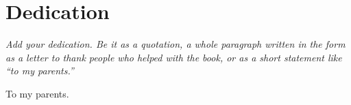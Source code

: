 
\thispagestyle{empty}


\chapter{Dedication}\label{dedication:cha}

\textit{Add your dedication. Be it as a quotation, a whole paragraph written in the form as a letter to thank people who helped with the book, or as a short statement like ``to my parents.''}

\begin{myquotation} To my parents.\par\end{myquotation}
